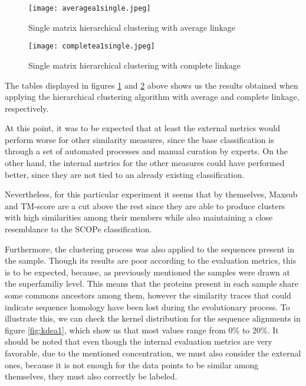 \begin{figure}[htbp]
	\centering
	\texttt{[image: averagea1single.jpeg]}
	\caption{Single matrix hierarchical clustering with average linkage}
	\label{fig:singlematrixaverage}
\end{figure}

\begin{figure}[htbp]
	\centering
	\texttt{[image: completea1single.jpeg]}
	\caption{Single matrix hierarchical clustering with complete linkage}
	\label{fig:singlematrixcomplete}
\end{figure}

The tables displayed in figures \ref{fig:singlematrixaverage} and \ref{fig:singlematrixcomplete} above shows us the results obtained when applying the hierarchical clustering algorithm with average and complete linkage, respectively. 


At this point, it was to be expected that at least the external metrics would perform worse for other similarity measures, since the base classification is through a set of automated processes and manual curation by experts. On the other hand, the internal metrics for the other measures could have performed better, since they are not tied to an already existing classification. 

Nevertheless, for this particular experiment it seems that by themselves, Maxsub and TM-score are a cut above the rest since they are able to produce clusters with high similarities among their members while also maintaining a close resemblance to the SCOPe classification.


Furthermore, the clustering process was also applied to the sequences present in the sample. Though its results are poor according to the evaluation metrics, this is to be expected, because, as previously mentioned the samples were drawn at the superfamiliy level. This means that the proteins present in each sample share some commons ancestors among them, however the similarity traces that could indicate sequence homology have been lost during the evolutionary process. To illustrate this, we can check the kernel distribution for the sequence alignments in figure \ref{fig:kdea1}, which show us that most values range from 0\% to 20\%. It should be noted that even though the internal evaluation metrics are very favorable, due to the mentioned concentration, we must also consider the external ones, because it is not enough for the data points to be similar among themselves, they must also correctly be labeled.

